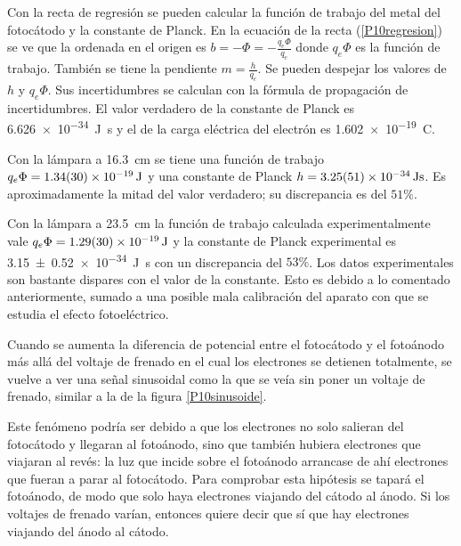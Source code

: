 \documentclass[12pt]{article}
\numberwithin{table}{section}
\numberwithin{figure}{section}
\numberwithin{equation}{section}
\newcommand{\data}[3]{\SI{#1 \pm #2}{#3}}
\begin{document}
Con la recta de regresión se pueden calcular la función de trabajo del metal del fotocátodo y la constante de Planck. En la ecuación de la recta (\ref{P10regresion}) se ve que la ordenada en el origen es $b=-\Phi=-\frac{q_e\Phi}{q_e}$ donde $q_e\Phi$ es la función de trabajo. También se tiene la pendiente $m=\frac{h}{q_e}$. Se pueden despejar los valores de $h$ y $q_e\Phi$. Sus incertidumbres se calculan con la fórmula de propagación de incertidumbres. El  valor verdadero de la constante de Planck es \SI{6.626e-34}{J s} y el de la carga eléctrica del electrón es \SI{1.602e-19}{C}.

Con la lámpara a \SI{16.3}{cm} se tiene una función de trabajo $q_e\Phi= \data{1.34}{0.30e-19}{J}$ y una constante de Planck $h= \data{3.25}{0.51e-34}{J s}$. Es aproximadamente la mitad del valor verdadero; su discrepancia es del $51\%$.

Con la lámpara a \SI{23.5}{cm} la función de trabajo calculada experimentalmente vale $q_e\Phi= \data{1.29}{0.30e-19}{J}$ y la constante de Planck experimental es \data{3.15}{0.52e-34}{J s} con un discrepancia del $53\%$. Los datos experimentales son bastante dispares con el valor de la constante. Esto es debido a lo comentado anteriormente, sumado a una posible mala calibración del aparato con que se estudia el efecto fotoeléctrico.

Cuando se aumenta la diferencia de potencial entre el fotocátodo y el fotoánodo más allá del voltaje de frenado en el cual los electrones se detienen totalmente, se vuelve a ver una señal sinusoidal como la que se veía sin poner un voltaje de frenado, similar a la de la figura \ref{P10sinusoide}.

Este fenómeno podría ser debido a que los electrones no solo salieran del fotocátodo y llegaran al fotoánodo, sino que también hubiera electrones que viajaran al revés: la luz que incide sobre el fotoánodo arrancase de ahí electrones que fueran a parar al fotocátodo. Para comprobar esta hipótesis se tapará el fotoánodo, de modo que solo haya electrones viajando del cátodo al ánodo. Si los voltajes de frenado varían, entonces quiere decir que sí que hay electrones viajando del ánodo al cátodo.
\end{document}
